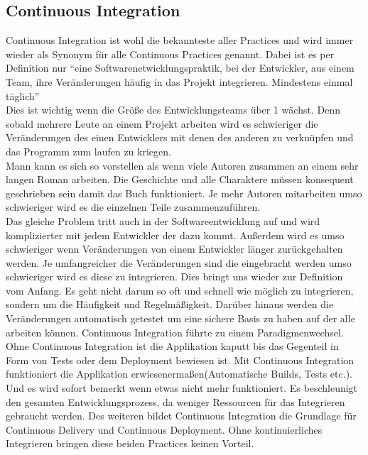 \subsection{Continuous Integration}
Continuous Integration ist wohl die bekannteste aller Practices und wird immer wieder als Synonym für alle Continuous Practices genannt.\autocite[Vgl.][S.12]{Stahl.2018} Dabei ist es per Definition nur \enquote{eine Softwarenetwicklungspraktik, bei der Entwickler, aus einem Team, ihre Veränderungen häufig in das Projekt integrieren. Mindestens einmal täglich}\autocite[S.12]{Stahl.2018}\\
Dies ist wichtig wenn die Größe des Entwicklungsteams über 1 wächst. Denn sobald mehrere Leute an einem Projekt arbeiten wird es schwieriger die Veränderungen des einen Entwicklers mit denen des anderen zu verknüpfen und das Programm zum laufen zu kriegen.\autocite[Vgl.][S.4]{Stahl.2018}\\ Mann kann es sich so vorstellen als wenn viele Autoren zusammen an einem sehr langen Roman arbeiten. Die Geschichte und alle Charaktere müssen konsequent geschrieben sein damit das Buch funktioniert. Je mehr Autoren mitarbeiten umso schwieriger wird es die einzelnen Teile zusammenzuführen.\\ Das gleiche Problem tritt auch in der Softwareentwicklung auf und wird komplizierter mit jedem Entwickler der dazu kommt. Außerdem wird es umso schwieriger wenn Veränderungen von einem Entwickler länger zurückgehalten werden. Je umfangreicher die Veränderungen sind die eingebracht werden umso schwieriger wird es diese zu integrieren. Dies bringt uns wieder zur Definition vom Anfang. Es geht nicht darum so oft und schnell wie möglich zu integrieren, sondern um die Häufigkeit und Regelmäßigkeit.\autocite[Vgl.][S.3]{Stahl.2018} Darüber hinaus werden die Veränderungen automatisch getestet um eine sichere Basis zu haben auf der alle arbeiten können. Continuous Integration führte zu einem Paradigmenwechsel. Ohne Continuous Integration ist die Applikation kaputt bis das Gegenteil in Form von Tests oder dem Deployment bewiesen ist. Mit Continuous Integration funktioniert die Applikation erwiesenermaßen(Automatische Builds, Tests etc.). Und es wird sofort bemerkt wenn etwas nicht mehr funktioniert.\autocite[Vgl.][S.40]{Farley.2010} Es beschleunigt den gesamten Entwicklungsprozess, da weniger Ressourcen für das Integrieren gebraucht werden. Des weiteren bildet Continuous Integration die Grundlage für Continuous Delivery und Continuous Deployment. Ohne kontinuierliches Integrieren bringen diese beiden Practices keinen Vorteil.
